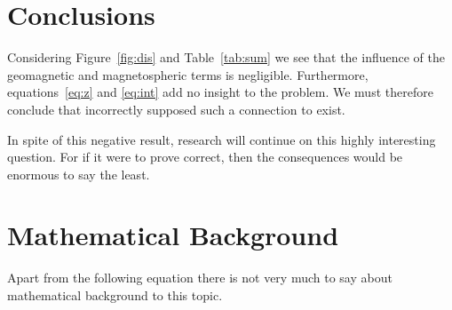 \documentclass[jgrga]{aguplus}                     %
\begin{document}
\begin{article}
\section{Conclusions}\label{sec:end}

Considering Figure~\ref{fig:dis} and Table~\ref{tab:sum} we see that the
influence of the geomagnetic and magnetospheric terms is negligible.
Furthermore, equations~\ref{eq:z} and \ref{eq:int} add no insight to the
problem. We must therefore conclude that \citet{phil99} incorrectly supposed
such a connection to exist.

In spite of this negative result, research will continue on this highly
interesting question. For if it were to prove correct, then the consequences
would be enormous to say the least.

\balance %

\appendix
\section*{Mathematical Background}
Apart from the following equation
there is not very much to say about mathematical background to this topic.




\end{article}
\end{document}
